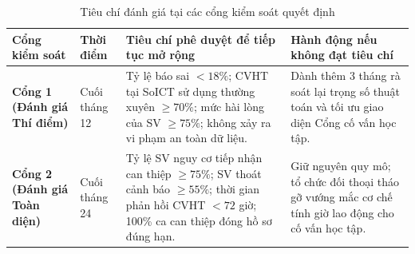 \begin{table}[htbp]
\centering
\caption{Tiêu chí đánh giá tại các cổng kiểm soát quyết định}
\label{tab:cong_kiem_soat}
\vspace{0.2cm}
\fontsize{8.5}{10.5}\selectfont
\begin{tabularx}{\textwidth}{|L{2.8cm}|C{1.8cm}|Y|Y|}
\hline
\textbf{Cổng kiểm soát} & \textbf{Thời điểm} & \textbf{Tiêu chí phê duyệt để tiếp tục mở rộng} & \textbf{Hành động nếu không đạt tiêu chí} \\
\hline
\textbf{Cổng 1 (Đánh giá Thí điểm)} & Cuối tháng 12 & Tỷ lệ báo sai $< 18\%$; CVHT tại SoICT sử dụng thường xuyên $\ge 70\%$; mức hài lòng của SV $\ge 75\%$; không xảy ra vi phạm an toàn dữ liệu. & Dành thêm 3 tháng rà soát lại trọng số thuật toán và tối ưu giao diện Cổng cố vấn học tập. \\
\hline
\textbf{Cổng 2 (Đánh giá Toàn diện)} & Cuối tháng 24 & Tỷ lệ SV nguy cơ tiếp nhận can thiệp $\ge 75\%$; SV thoát cảnh báo $\ge 55\%$; thời gian phản hồi CVHT $< 72$ giờ; 100\% ca can thiệp đóng hồ sơ đúng hạn. & Giữ nguyên quy mô; tổ chức đối thoại tháo gỡ vướng mắc cơ chế tính giờ lao động cho cố vấn học tập. \\
\hline
\end{tabularx}
\end{table}
